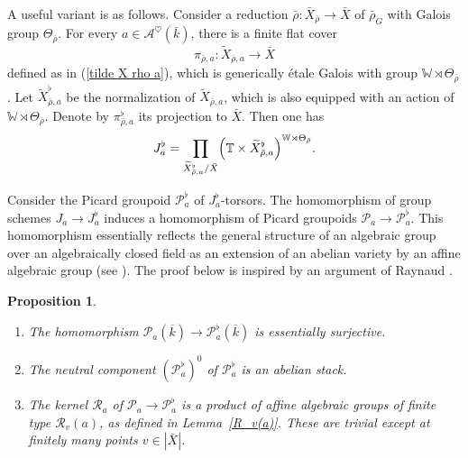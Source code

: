 \documentclass[12pt,english]{smfart}
\numberwithin{equation}{subsection}
\newtheorem{proposition}[equation]{Proposition}
\theoremstyle{remark}
\begin{document}
A useful variant is as follows. Consider a reduction $\bar \rho:\bar X_{\bar \rho}\rightarrow \bar X$ of $\bar\rho_G$
with Galois group $\Theta_{\bar\rho}$. For every $a\in\mathcal{A}^\heartsuit(\bar{k})$, there is a finite flat cover
$$
\pi_{\bar\rho,a}:\widetilde X_{\bar\rho,a}\rightarrow \bar X
$$
defined as in (\ref{tilde X rho a}), which is generically \'etale Galois with group $\mathbb{W}\rtimes \Theta_{\bar\rho}$.
Let $\widetilde X_{\bar\rho,a}^\flat$ be the normalization of $\widetilde X_{\bar\rho,a}$, which is also equipped with an action of $\mathbb{W}\rtimes \Theta_{\bar\rho}$.
Denote by $\pi_{\bar\rho,a}^\flat$ its projection to $\bar{X}$. Then one has
$$
J_a^\flat=\prod_{\widetilde X_{\bar\rho,a}^\flat/\bar X}
\Bigl(\mathbb{T}\times \widetilde X_{\bar\rho,a}^\flat\Bigr)^{\mathbb{W}\rtimes \Theta_{\bar\rho}}.
$$

Consider the Picard groupoid $\mathcal{P}_a^\flat$ of $J_a^\flat$-torsors.
The homomorphism of group schemes $J_a\rightarrow J_a^\flat$ induces a homomorphism of Picard groupoids $\mathcal{P}_a\rightarrow \mathcal{P}_a^\flat$.
This homomorphism essentially reflects the general structure of an algebraic group over an algebraically closed field
as an extension of an abelian variety by an affine algebraic group (see \cite{Ros}). The proof below is inspired by an argument of Raynaud \cite{Ray}.

\begin{proposition}\label{P a flat}
\begin{enumerate}
\item The homomorphism $\mathcal{P}_a(\overline{k})\rightarrow \mathcal{P}_a^\flat(\overline{k})$ is essentially surjective.

\item The neutral component $(\mathcal{P}_a^\flat)^0$ of $\mathcal{P}_a^\flat$ is an abelian stack.

\item The kernel $\mathcal{R}_a$ of $\mathcal{P}_a\rightarrow \mathcal{P}_a^\flat$ is a product of affine algebraic groups of finite type $\mathcal{R}_v(a)$, as defined in Lemma~\ref{R_v(a)}.
These are trivial except at finitely many points $v\in |\bar X|$.
\end{enumerate}
\end{proposition}
\end{document}
